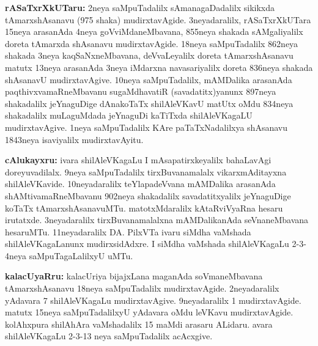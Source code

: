 \documentclass[11pt,a4size]{article}
\begin{document}
\medskip
\textbf{\Large rASaTxrXkUTaru:} 2neya saMpuTadalilx sAmanagaDadalilx
sikikxda tAmarxshAsanavu (975 shaka) mudirxtavAgide. 3neyadaralilx,
rASaTxrXkUTara 15neya arasanAda 4neya goVviMdaneMbavana, 855neya
shakada sAMgaliyalilx doreta tAmarxda shAsanavu mudirxtavAgide. 18neya
saMpuTadalilx 862neya shakada 3neya kaqSaNxneMbavana, deVvaLeyalilx
doreta tAmarxshAsanavu matutx 13neya arasanAda 3neya iMdarxna
navasariyalilx doreta 836neya shakada shAsanavU mudirxtavAgive. 10neya
saMpuTadalilx, mAMDalika arasanAda paqthivxvamaRneMbavanu
sugaMdhavatiR (savadatitx)yanunx 897neya shakadalilx jeYnaguDige
dAnakoTaTx shilAleVKavU matUtx oMdu 834neya shakadalilx muLaguMdada
jeYnaguDi kaTiTxda shilAleVKagaLU mudirxtavAgive. 1neya saMpuTadalilx
KAre paTaTxNadalilxya shAsanavu 1843neya isaviyalilx mudirxtavAyitu.

\medskip
\textbf{\Large cAlukayxru:} ivara shilAleVKagaLu I mAsapatirxkeyalilx
bahaLavAgi doreyuvadilalx. 9neya saMpuTadalilx tirxBuvanamalalx
vikarxmAditayxna shilAleVKavide. 10neyadaralilx teYlapadeVvana
mAMDalika arasanAda shAMtivamaRneMbavanu 902neya shakadalilx
savadatitxyalilx jeYnaguDige koTaTx
tAmarxshAsanavuMTu. matotxMdaralilx kAtaRviVyaRna hesaru
irutatxde. 3neyadaralilx tirxBuvanamalalxna mAMDalikanAda
seVnaneMbavana hesaruMTu. 11neyadaralilx DA. PilxVTa ivaru siMdha
vaMshada shilAleVKagaLanunx mudirxsidAdxre. I siMdha vaMshada
shilAleVKagaLu 2-3-4neya saMpuTagaLalilxyU uMTu.

\medskip
\textbf{\Large kalacUyaRru:} 
kalacUriya bijajxLana maganAda soVmaneMbavana tAmarxshAsanavu 18neya
saMpuTadalilx mudirxtavAgide. 2neyadaralilx yAdavara 7 shilAleVKagaLu
mudirxtavAgive. 9neyadaralilx 1 mudirxtavAgide. matutx 15neya
saMpuTadalilxyU yAdavara oMdu leVKavu mudirxtavAgide. kolAhxpura
shilAhAra vaMshadalilx 15 maMdi arasaru ALidaru. avara shilAleVKagaLu
2-3-13 neya saMpuTadalilx acAcxgive.
\end{document}
